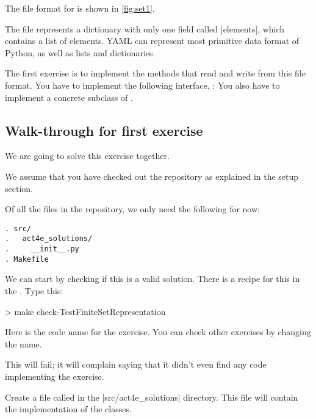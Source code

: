 The file format for  is shown in \cref{fig:set1}.


The file represents a dictionary with only one field called \pystr|elements|, which contains a list of elements.
YAML can represent most primitive data format of Python, as well as lists and dictionaries.

\begin{gradedexercise}
  \label{ex:setrepr}
  The first exercise is to implement the methods that read and write from this file format.
  You have to implement the following interface, :
%
  You also have to implement a concrete subclass of .
\end{gradedexercise}

\subsection{Walk-through for first exercise}

We are going to solve this exercise together.

We assume that you have checked out the repository as explained in the setup section.

Of all the files in the repository, we only need the following for now:

\begin{verbatim}
. src/
.   act4e_solutions/
.     __init__.py
. Makefile
\end{verbatim}


We can start by checking if this is a valid solution. There is a recipe for this in the .
Type this:

\begin{console}
  > make check-TestFiniteSetRepresentation
\end{console}

Here  is the code name for the exercise. You can check other exercises by changing the name.

This will fail; it will complain saying that it didn't even find any code implementing the exercise.


Create a file called  in the \files|src/act4e_solutions| directory.
This file will contain the implementation of the classes.


